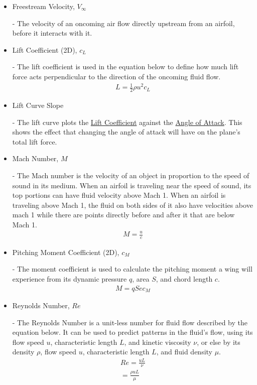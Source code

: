 \documentclass{article}
\begin{document}
\begin{itemize}
	\item \hypertarget{Vinf}{Freestream Velocity, $V_{\infty}$} - The velocity of an oncoming air flow directly upstream from an airfoil, before it interacts with it.
		
	\item \hypertarget{CL}{Lift Coefficient (2D), $c_{L}$} - The lift coefficient is used in the equation below to define how much lift force acts perpendicular to the direction of the oncoming fluid flow.
		\begin{equation} \label{eq:3}
		\begin{aligned}
        			L = \frac{1}{2} \rho u^{2} c_{L}
	    	\end{aligned}
		\end{equation}
	
	\item \hypertarget{LC}{Lift Curve Slope} - The lift curve plots the \hyperlink{CL}{Lift Coefficient} against the \hyperlink{alpha}{Angle of Attack}. This shows the effect that changing the angle of attack will have on the plane's total lift force.
		
	\item \hypertarget{M}{Mach Number, $M$} - The Mach number is the velocity of an object in proportion to the speed of sound in its medium. When an airfoil is traveling near the speed of sound, its top portions can have fluid velocity above Mach 1. When an airfoil is traveling above Mach 1, the fluid on both sides of it also have velocities above mach 1 while there are points directly before and after it that are below Mach 1.
		\begin{equation} \label{eq:4}
		\begin{aligned}
        			M = \frac{u}{c}
	    	\end{aligned}
		\end{equation}
		
	\item \hypertarget{CM}{Pitching Moment Coefficient (2D), $c_{M}$} - The moment coefficient is used to calculate the pitching moment a wing will experience from its dynamic pressure $q$, area $S$, and chord length $c$.
		\begin{equation} \label{eq:5}
		\begin{aligned}
        			M = q S e c_{M}
	    	\end{aligned}
		\end{equation}
	
	\item \hypertarget{Re}{Reynolds Number, $Re$} - The Reynolds Number is a unit-less number for fluid flow described by the equation below. It can be used to predict patterns in the fluid's flow, using its flow speed $u$, characteristic length $L$, and kinetic viscosity $\nu$, or else by its density $\rho$, flow speed $u$, characteristic length $L$, and fluid density $\mu$.
		\begin{equation} \label{eq:6}
		\begin{aligned}
        			Re = \frac{uL}{\nu} \\
			= \frac{\rho uL}{\mu} 
	    	\end{aligned}
		\end{equation}
	

\end{itemize}
\end{document}
